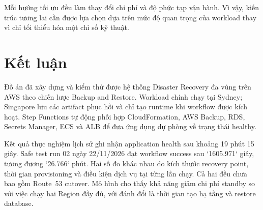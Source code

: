 Mỗi hướng tối ưu đều làm thay đổi chi phí và độ phức tạp vận hành. Vì vậy, kiến trúc tương lai cần được lựa chọn dựa trên mức độ quan trọng của workload thay vì chỉ tối thiểu hóa một chỉ số kỹ thuật.

\section{Kết luận}

Đồ án đã xây dựng và kiểm thử được hệ thống Disaster Recovery đa vùng trên AWS theo chiến lược Backup and Restore. Workload chính chạy tại Sydney; Singapore lưu các artifact phục hồi và chỉ tạo runtime khi workflow được kích hoạt. Step Functions tự động phối hợp CloudFormation, AWS Backup, RDS, Secrets Manager, ECS và ALB để đưa ứng dụng dự phòng về trạng thái healthy.

Kết quả thực nghiệm lịch sử ghi nhận application health sau khoảng 19 phút 15 giây. Safe test run 02 ngày 22/11/2026 đạt workflow success sau `1605.971` giây, tương đương `26.766` phút. Hai số đo khác nhau do kích thước recovery point, thời gian provisioning và điều kiện dịch vụ tại từng lần chạy. Cả hai đều chưa bao gồm Route~53 cutover. Mô hình cho thấy khả năng giảm chi phí standby so với việc chạy hai Region đầy đủ, với đánh đổi là thời gian tạo hạ tầng và restore database.
